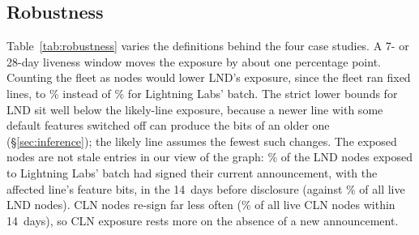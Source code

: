 \subsection{Robustness}
\label{sec:robust}
Table~\ref{tab:robustness} varies the definitions behind the four case studies. A 7- or 28-day liveness window moves
the exposure by about one percentage point. Counting the fleet as nodes would lower LND's exposure, since the fleet
ran fixed lines, to \RobFleetLLBatchDisc\% instead of \ExpLLBatchDisc\% for Lightning Labs' batch. The strict lower
bounds for LND sit well below the likely-line exposure, because a newer line with some default features switched off
can produce the bits of an older one (\S\ref{sec:inference}); the likely line assumes the fewest such changes. The
exposed nodes are not stale entries in our view of the graph: \RobSignedLLBatchDisc\% of the LND nodes exposed to
Lightning Labs' batch had signed their current announcement, with the affected line's feature bits, in the 14~days
before disclosure (against \RobSignedAllLLBatchDisc\% of all live LND nodes). CLN nodes re-sign far less often
(\RobSignedAllClnGossipdDisc\% of all live CLN nodes within 14~days), so CLN exposure rests more on the absence of a
new announcement.


